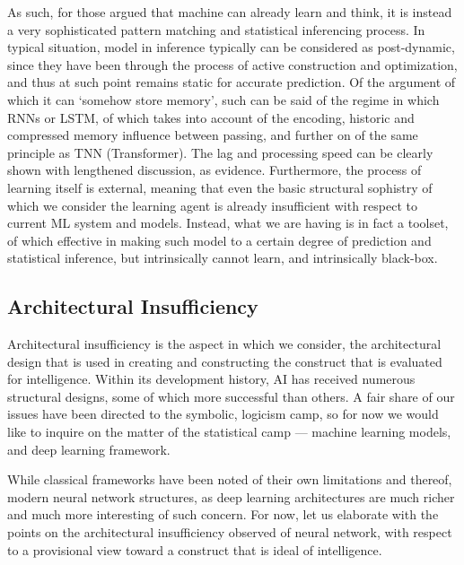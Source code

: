 As such, for those argued that machine can already learn and think, it is instead a very sophisticated pattern matching and statistical inferencing process. In typical situation, model in inference typically can be considered as post-dynamic, since they have been through the process of active construction and optimization, and thus at such point remains static for accurate prediction. Of the argument of which it can `somehow store memory', such can be said of the regime in which RNNs or LSTM, of which takes into account of the encoding, historic and compressed memory influence between passing, and further on of the same principle as TNN (Transformer). The lag and processing speed can be clearly shown with lengthened discussion, as evidence. Furthermore, the process of learning itself is external, meaning that even the basic structural sophistry of which we consider the learning agent is already insufficient with respect to current ML system and models. Instead, what we are having is in fact a toolset, of which effective in making such model to a certain degree of prediction and statistical inference, but intrinsically cannot learn, and intrinsically black-box. 

\subsection{Architectural Insufficiency}

Architectural insufficiency is the aspect in which we consider, the architectural design that is used in creating and constructing the construct that is evaluated for intelligence. Within its development history, AI has received numerous structural designs, some of which more successful than others. A fair share of our issues have been directed to the symbolic, logicism camp, so for now we would like to inquire on the matter of the statistical camp --- machine learning models, and deep learning framework. 

While classical frameworks have been noted of their own limitations and thereof, modern neural network structures, as deep learning architectures are much richer and much more interesting of such concern. For now, let us elaborate with the points on the architectural insufficiency observed of neural network, with respect to a provisional view toward a construct that is ideal of intelligence. 

